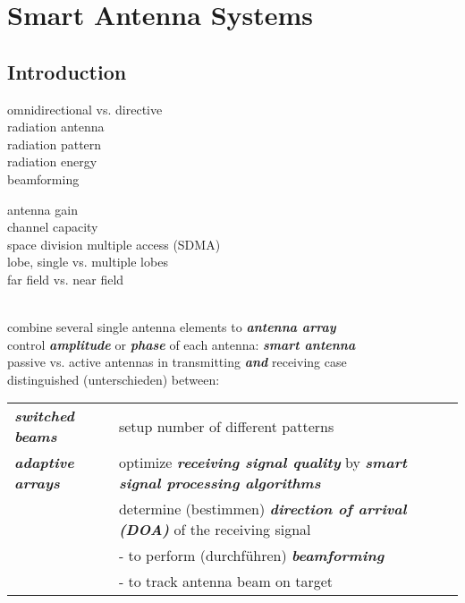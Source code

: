 \documentclass[
	final,
	a4paper,
	oneside,
	parskip=full,
	headings=standardclasses,
	headings=big,
	pointednumbers
]{scrartcl}
\newcommand{\bi}[1]{\textit{\textbf{#1}}}
\begin{document}
    \section{Smart Antenna Systems}

    \subsection{Introduction}

	\begin{minipage}{0.5\textwidth}
        omnidirectional vs. directive \\
        radiation antenna \\
        radiation pattern \\
        radiation energy \\
        beamforming
	\end{minipage}
	\begin{minipage}{0.5\textwidth}
        antenna gain \\
        channel capacity \\
        space division multiple access (SDMA) \\
        lobe, single vs. multiple lobes \\
        far field vs. near field
	\end{minipage} \\
    combine several single antenna elements to \bi{antenna array} \\
    control \bi{amplitude} or \bi{phase} of each antenna: \bi{smart antenna} \\
    passive vs. active antennas in transmitting \bi{and} receiving case \\
    distinguished (unterschieden) between: \\
    \setlength{\tabcolsep}{0cm}
    \begin{tabular}{p{5cm}p{8.5cm}}
        \bi{switched beams}     & setup number of different patterns \\
        \bi{adaptive arrays}    & optimize \bi{receiving signal quality} by
                                  \bi{smart signal processing algorithms} \\
                                & determine (bestimmen) \bi{direction of arrival (DOA)}
                                  of the receiving signal \\
                                & - to perform (durchführen) \bi{beamforming} \\
                                & - to track antenna beam on target
    \end{tabular} \\
\end{document}
